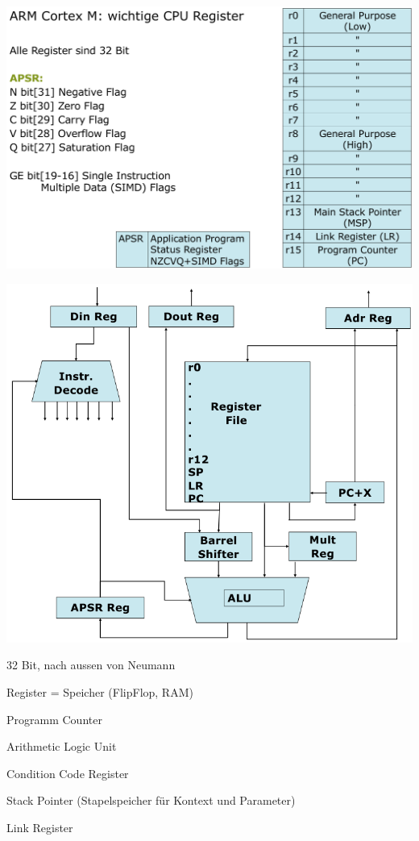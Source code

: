 \documentclass[
  10pt,
  a4paper,
]{article}
\begin{document}
\begin{multicols*}{2}
\includegraphics{images/performance/image-11.png}

\includegraphics{images/performance/image-12.png}

{\footnotesize 32 Bit, nach aussen von Neumann}
{\small\begin{description}[style=sameline,parsep=0mm,labelsep=4pt]
  \item[Reg] Register = Speicher (FlipFlop, RAM)
  \item[PC] Programm Counter
  \item[ALU] Arithmetic Logic Unit
  \item[APSR] Condition Code Register
  \item[SP] Stack Pointer (Stapelspeicher für Kontext und Parameter)
  \item[LR] Link Register
\end{description}
}


\end{multicols*}
\end{document}
